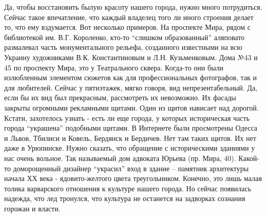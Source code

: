 
Да, чтобы восстановить былую красоту нашего города, нужно много потрудиться.
Сейчас такое впечатление, что каждый владелец того ли иного строения делает то,
что ему вздумается. Вот несколько примеров. На проспекте Мира, рядом с
библиотекой им. В.Г. Короленко, кто-то \enquote{слишком образованный} аляповато
размалевал часть монументального рельефа, созданного известными на всю Украину
художниками В.К. Константиновым и Л.Н. Кузьменковым. Дома №43 и 45 по проспекту
Мира, это у Театрального сквера.  Когда-то они были  излюбленным элементом
сюжетов как для профессиональных фотографов,  так и для любителей. Сейчас у
пятиэтажек, мягко говоря, вид непрезентабельный. Да, если бы их вид был
прекрасным,  рассмотреть их невозможно.  Их фасады закрыты  огромными
рекламными щитами. Один из щитов нависает над дорогой. Кстати, захотелось
узнать - есть ли еще города, у которых историческая часть города \enquote{украшена}
подобными щитами. В Интернете были просмотрены  Одесса и Львов, Тбилиси и
Ковель, Бердянск и Бердичев. Нет там таких щитов. Их нет даже в Урюпинске.
Нужно сказать, что обращение с историческими зданиями у нас очень вольное. Так
называемый дом адвоката Юрьева  (пр. Мира, 40). Какой-то доморощенный дизайнер
\enquote{украсил} вход в здание – памятник архитектуры начала ХХ века -
ядовито-желтого цвета треугольником. Конечно, это лишь малая толика варварского
отношения к культуре нашего города. Но сейчас появилась надежда, что лед
тронулся, что культура не останется на задворках сознания горожан и власти.
